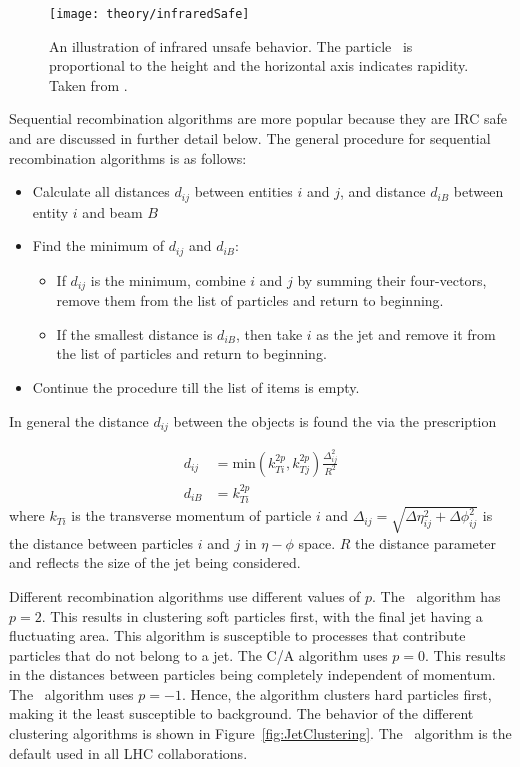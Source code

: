 \begin{figure}[htp]
\centering
\texttt{[image: theory/infraredSafe]}
\caption{An illustration of infrared unsafe behavior.
The particle \pt\ is proportional to the height and the horizontal axis indicates rapidity.
Taken from \cite{Salam_2007}.}
\label{fig:infraredSafe}
\end{figure}

Sequential recombination algorithms are more popular because they are IRC safe and are discussed in further detail below. 
The general procedure for sequential recombination algorithms is as follows:
\begin{itemize}
\item Calculate all distances $d_{ij}$ between entities $i$ and $j$, and distance $d_{iB}$ between entity $i$ and beam $B$
\item Find the minimum of $d_{ij}$ and $d_{iB}$:
\begin{itemize}
\item If $d_{ij}$ is the minimum, combine $i$ and $j$ by summing their four-vectors, remove them from the list of particles and return to beginning.
\item If the smallest distance is $d_{iB}$, then take $i$ as the jet and remove it from the list of particles and return to beginning.
\end{itemize}
\item Continue the procedure till the list of items is empty.
\end{itemize}

In general the distance $d_{ij}$ between the objects is found the via the prescription

\begin{align}
d_{ij} &= \mathrm{min} (k_{Ti}^{2p} , k_{Tj}^{2p}) \frac{\Delta_{ij}^2}{R^2}  \\
d_{iB} &= k_{Ti}^{2p}
\end{align}
where $k_{Ti}$ is the transverse momentum of particle $i$ and $\Delta_{ij} = \sqrt{\Delta\eta_{ij}^2 + \Delta\phi_{ij}^2}$ is the distance between particles $i$ and $j$ in $\eta-\phi$ space.
$R$ the distance parameter and reflects the size of the jet being considered.

Different recombination algorithms use different values of $p$. 
The \kt\ algorithm has $p = 2$.
This results in clustering soft particles first, with the final jet having a fluctuating area.
This algorithm is susceptible to processes that contribute particles that do not belong to a jet.
The C/A algorithm uses $p = 0$.
This results in the distances between particles being completely independent of momentum. 
The \antikt\ algorithm uses $p = -1$.
Hence, the algorithm clusters hard particles first, making it the least susceptible to background. 
The behavior of the different clustering algorithms is shown in Figure~\ref{fig:JetClustering}.
The \antikt\ algorithm is the default used in all LHC collaborations.

